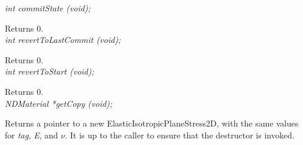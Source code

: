 {\em int commitState (void); } 

Returns $0$. \\

{\em int revertToLastCommit (void); } 

Returns $0$. \\

{\em int revertToStart (void); } 

Returns $0$. \\

{\em NDMaterial *getCopy (void); } 

Returns a pointer to a new ElasticIsotropicPlaneStress2D, with the
same values for {\em tag}, {\em E}, and $\nu$. It is up to the
caller to ensure that the destructor is invoked. \\